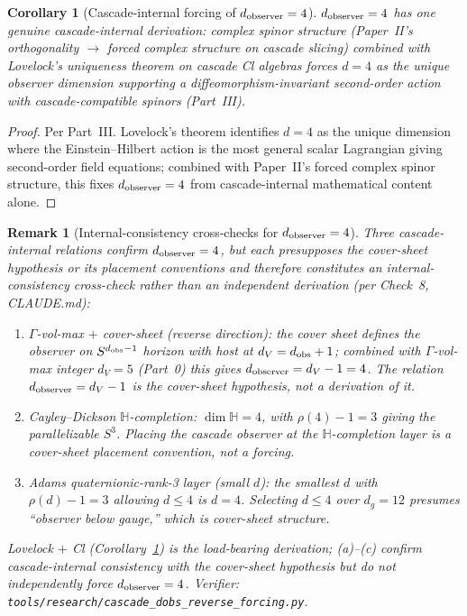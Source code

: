 \documentclass[12pt,a4paper]{article}
\newtheorem{corollary}[theorem]{Corollary}
\newtheorem*{remark}{Remark}
\begin{document}
\begin{corollary}[Cascade-internal forcing of $d_{\rm observer} = 4$]\label{cor:dobs-multi-route}
$d_{\rm observer} = 4$ has one genuine cascade-internal derivation: complex spinor structure (Paper~II's orthogonality $\to$ forced complex structure on cascade slicing) combined with Lovelock's uniqueness theorem on cascade Cl algebras forces $d=4$ as the unique observer dimension supporting a diffeomorphism-invariant second-order action with cascade-compatible spinors (Part~III).
\end{corollary}

\begin{proof}
Per Part~III. Lovelock's theorem identifies $d=4$ as the unique dimension where the Einstein--Hilbert action is the most general scalar Lagrangian giving second-order field equations; combined with Paper~II's forced complex spinor structure, this fixes $d_{\rm observer} = 4$ from cascade-internal mathematical content alone.
\end{proof}

\begin{remark}[Internal-consistency cross-checks for $d_{\rm observer}=4$]\label{rem:dobs-cross-checks}
Three cascade-internal relations confirm $d_{\rm observer}=4$, but each presupposes the cover-sheet hypothesis or its placement conventions and therefore constitutes an \emph{internal-consistency cross-check} rather than an independent derivation (per Check~8, CLAUDE.md):
\begin{enumerate}[nosep,label=(\alph*)]
\item \emph{$\Gamma$-vol-max $+$ cover-sheet (reverse direction):} the cover sheet defines the observer on $S^{d_{\rm obs}-1}$ horizon with host at $d_V = d_{\rm obs}+1$; combined with $\Gamma$-vol-max integer $d_V = 5$ (Part~0) this gives $d_{\rm observer} = d_V - 1 = 4$. The relation $d_{\rm observer} = d_V - 1$ \emph{is} the cover-sheet hypothesis, not a derivation of it.
\item \emph{Cayley--Dickson $\mathbb{H}$-completion:} $\dim\mathbb{H} = 4$, with $\rho(4) - 1 = 3$ giving the parallelizable $S^3$. Placing the cascade observer at the $\mathbb{H}$-completion layer is a cover-sheet placement convention, not a forcing.
\item \emph{Adams quaternionic-rank-3 layer (small $d$):} the smallest $d$ with $\rho(d) - 1 = 3$ allowing $d \leq 4$ is $d=4$. Selecting $d \leq 4$ over $d_g = 12$ presumes ``observer below gauge,'' which is cover-sheet structure.
\end{enumerate}
Lovelock $+$ Cl (Corollary~\ref{cor:dobs-multi-route}) is the load-bearing derivation; (a)--(c) confirm cascade-internal consistency with the cover-sheet hypothesis but do not independently force $d_{\rm observer}=4$. Verifier: \texttt{tools/research/cascade\_dobs\_reverse\_forcing.py}.
\end{remark}
\end{document}
